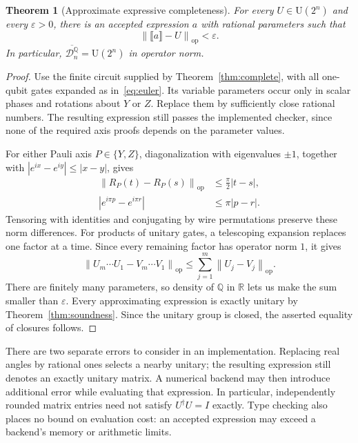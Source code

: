 \documentclass[11pt,a4paper]{article}
\newcommand{\R}{\mathbb R}
\newcommand{\Q}{\mathbb Q}
\newcommand{\U}{\mathrm U}
\newcommand{\sem}[1]{\llbracket #1\rrbracket}
\newcommand{\opnorm}[1]{\left\lVert #1\right\rVert_{\mathrm{op}}}
\newcommand{\rot}[2]{R_{#1}(#2)}
\newtheorem{theorem}{Theorem}
\begin{document}
\begin{theorem}[Approximate expressive completeness]
For every $U\in\U(2^n)$ and every $\varepsilon>0$, there is an
accepted expression $a$ with rational parameters such that
\[
  \opnorm{\sem a-U}<\varepsilon.
\]
In particular, $\overline{\mathcal D_n^{\Q}}=\U(2^n)$ in operator norm.
\label{thm:density}
\end{theorem}
\begin{proof}
Use the finite circuit supplied by Theorem~\ref{thm:complete}, with
all one-qubit gates expanded as in~\eqref{eq:euler}. Its variable
parameters occur only in scalar phases and rotations about $Y$ or $Z$.
Replace them by sufficiently close rational numbers. The resulting
expression still passes the implemented checker, since none of the
required axis proofs depends on the parameter values.

For either Pauli axis $P\in\{Y,Z\}$, diagonalization with eigenvalues
$\pm1$, together with $|e^{ix}-e^{iy}|\leq|x-y|$, gives
\begin{align}
  \opnorm{\rot Pt-\rot Ps}&\leq\frac{\pi}{2}|t-s|,\label{eq:rot-bound}\\
  |e^{i\pi p}-e^{i\pi r}|&\leq\pi|p-r|.\label{eq:phase-bound}
\end{align}
Tensoring with identities and conjugating by wire permutations
preserve these norm differences. For products of unitary gates,
a telescoping expansion replaces one factor at a time. Since every
remaining factor has operator norm $1$, it gives
\begin{equation}
  \opnorm{U_m\cdots U_1-V_m\cdots V_1}
  \leq\sum_{j=1}^m\opnorm{U_j-V_j}.
  \label{eq:telescoping}
\end{equation}
There are finitely many parameters, so density of $\Q$ in $\R$
lets us make the sum smaller than $\varepsilon$.
Every approximating expression is exactly unitary by
Theorem~\ref{thm:soundness}. Since the unitary group is closed,
the asserted equality of closures follows.
\end{proof}

There are two separate errors to consider in an implementation.
Replacing real angles by rational ones selects a nearby unitary; the
resulting expression still denotes an exactly unitary matrix. A numerical
backend may then introduce additional error while evaluating that
expression. In particular, independently rounded matrix entries need
not satisfy $U^\dagger U=I$ exactly.
Type checking also places no bound on evaluation cost: an accepted
expression may exceed a backend's memory or arithmetic limits.
\end{document}
